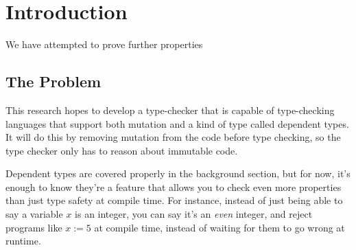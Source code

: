 \documentclass[12pt,twoside]{report}
\begin{document}
\chapter{Introduction}



We have attempted to prove further properties 

\section{The Problem}
This research hopes to develop a type-checker that is capable of type-checking languages that support both mutation and a kind of type called dependent types. It will do this by removing mutation from the code before type checking, so the type checker only has to reason about immutable code.

Dependent types are covered properly in the background section, but for now, it's enough to know they're a feature that allows you to check even more properties than just type safety at compile time. For instance, instead of just being able to say a variable $x$ is an integer, you can say it's an \textit{even} integer, and reject programs like $x := 5$ at compile time, instead of waiting for them to go wrong at runtime.
\end{document}

